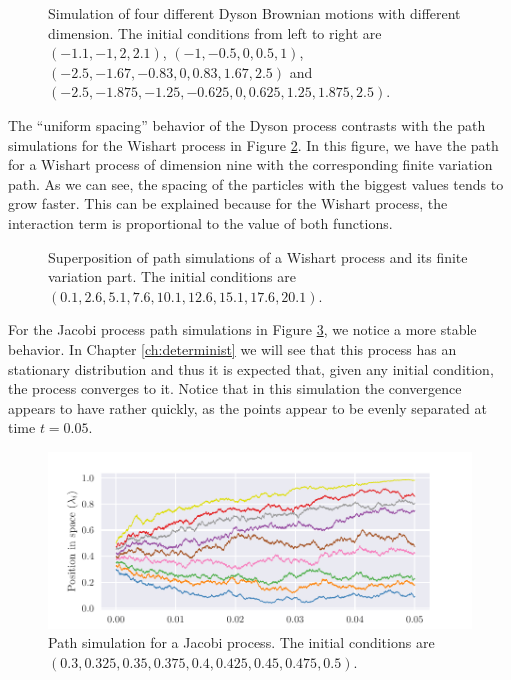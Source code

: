 \begin{figure}[h!] \centering 
    
    \caption{Simulation of four different Dyson Brownian motions with different dimension. The initial conditions from left to right are $(-1.1,-1,2,2.1)$, $(-1, -0.5, 0, 0.5, 1)$, $(-2.5,-1.67,-0.83,0,0.83,1.67,2.5)$ and $(-2.5,-1.875,-1.25,-0.625,0,0.625,1.25,1.875,2.5)$.\label{fig:four_dyson}}
\end{figure}

The ``uniform spacing'' behavior of the Dyson process contrasts with the path simulations for the Wishart process in Figure \ref{fig:wishart_comparison}. In this figure, we have the path for a Wishart process of dimension nine with the corresponding finite variation path. As we can see, the spacing of the particles with the biggest values tends to grow faster. This can be explained because for the Wishart process, the interaction term is proportional to the value of both functions.

\begin{figure} \centering 
    
    \caption{Superposition of path simulations of a Wishart process and its finite variation part. The initial conditions are $(0.1,2.6,5.1,7.6,10.1,12.6,15.1,17.6,20.1)$.\label{fig:wishart_comparison}}
\end{figure}

For the Jacobi process path simulations in Figure \ref{fig:jacobi}, we notice a more stable behavior. In Chapter \ref{ch:determinist} we will see that this process has an stationary distribution and thus it is expected that, given any initial condition, the process converges to it. Notice that in this simulation the convergence appears to have rather quickly, as the points appear to be evenly separated at time $t=0.05$.

\begin{figure} \centering
    \includegraphics[width=6in]{img/jacobi.pdf}
    \caption{Path simulation for a Jacobi process. The initial conditions are $(0.3,0.325,0.35,0.375,0.4,0.425,0.45,0.475,0.5)$.\label{fig:jacobi}}
\end{figure}


